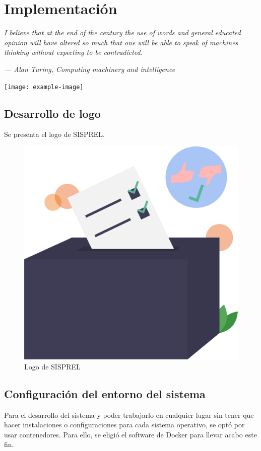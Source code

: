 \chapter{Implementación} 
\epigraph{\textit{I believe that at the end of the century the use of words and general educated opinion will have altered so much that one will be able to speak of machines thinking without expecting to be contradicted.     
	}}{\textit{—  Alan Turing, Computing machinery and intelligence}}
	\vspace*{8cm}
	\begin{center}
		\centering
		\texttt{[image: example-image]}
	\end{center}
	\thispagestyle{empty}
	\newpage
\vspace*{2cm}

\section{Desarrollo de logo}
Se presenta el logo de SISPREL.
\begin{figure}[!htb]
    \centering
    \includegraphics[scale=0.25]{TT/img/sisprel.png}
    \caption{Logo de SISPREL}
    \label{graphic:SISPRELLogo}    
\end{figure}

\section{Configuración del entorno del sistema}
Para el desarrollo del sistema y poder trabajarlo en cualquier lugar sin tener que hacer instalaciones o configuraciones para cada sistema operativo, se optó por usar contenedores. Para ello, se eligió el software de Docker para llevar acabo este fin. 

